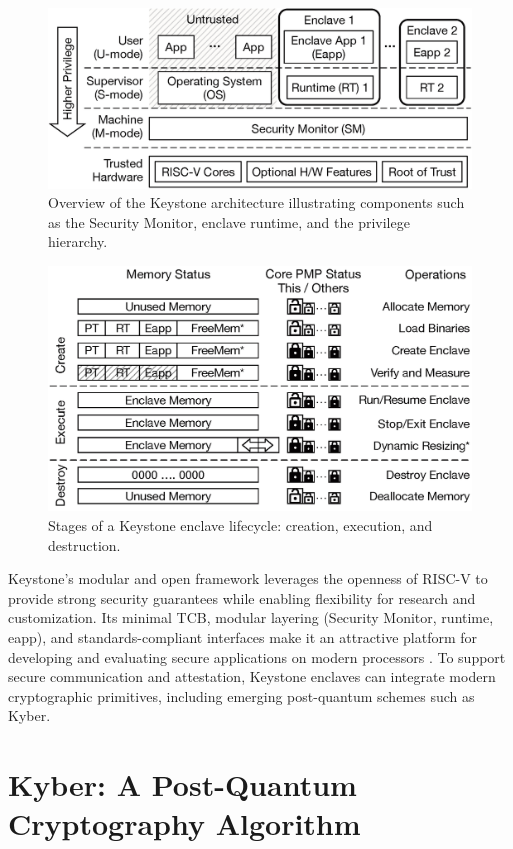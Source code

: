 \begin{figure}[htbp]
\centering
\includegraphics[width=0.9\linewidth]{figures/keystone_overview.png}
\caption{Overview of the Keystone architecture illustrating components such as the Security Monitor, enclave runtime, and the privilege hierarchy.}
\label{fig:keystone_overview}
\end{figure}

\begin{figure}[htbp]
\centering
\includegraphics[width=0.9\linewidth]{figures/enclave_lifecycle.png}
\caption{Stages of a Keystone enclave lifecycle: creation, execution, and destruction.}
\label{fig:enclave_lifecycle}
\end{figure}

Keystone’s modular and open framework leverages the openness of RISC-V to provide strong security guarantees while enabling flexibility for research and customization. Its minimal TCB, modular layering (Security Monitor, runtime, eapp), and standards-compliant interfaces make it an attractive platform for developing and evaluating secure applications on modern processors \cite{dayeol2019keystone}. 
To support secure communication and attestation, Keystone enclaves can integrate modern cryptographic primitives, including emerging post-quantum schemes such as Kyber.

\section{Kyber: A Post-Quantum Cryptography Algorithm}
\label{sec:kyber}

